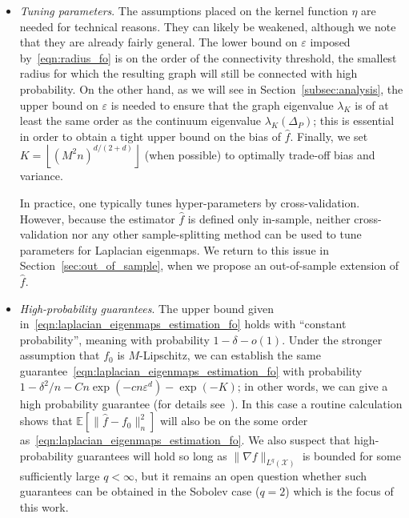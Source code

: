 \documentclass{article}
\newcommand{\floor}[1]{\left\lfloor #1 \right\rfloor}
\newcommand{\1}{\mathbf{1}}
\newcommand{\mc}[1]{\mathcal{#1}}
\newcommand{\Ebb}{\mathbb{E}}
\newcommand{\wh}[1]{\widehat{#1}}
\theoremstyle{alden}
\theoremstyle{aldenthm}
\theoremstyle{definition}
\theoremstyle{remark}
\begin{document}
\begin{itemize}
	\item \emph{Tuning parameters}. The assumptions placed on the kernel function $\eta$ are needed for technical reasons. They can likely be weakened, although we note that they are already fairly general. The lower bound on $\varepsilon$ imposed by~\eqref{eqn:radius_fo} is on the order of the connectivity threshold, the smallest radius for which the resulting graph will still be connected with high probability. On the other hand, as we will see in Section~\ref{subsec:analysis}, the upper bound on $\varepsilon$ is needed to ensure that the graph eigenvalue $\lambda_K$ is of at least the same order as the continuum eigenvalue $\lambda_K(\Delta_P)$; this is essential in order to obtain a tight upper bound on the bias of $\wh{f}$.  Finally, we set $K = \floor{(M^2n)^{d/(2 + d)}}$ (when possible) to optimally trade-off bias and variance.
	
	In practice, one typically tunes hyper-parameters by cross-validation. However, because the estimator $\wh{f}$ is defined only in-sample, neither cross-validation nor any other sample-splitting method can be used to tune parameters for Laplacian eigenmaps. We return to this issue in Section~\ref{sec:out_of_sample}, when we propose an out-of-sample extension of $\wh{f}$. 
	
	\item \emph{High-probability guarantees}. The upper bound given in~\eqref{eqn:laplacian_eigenmaps_estimation_fo} holds with ``constant probability'', meaning with probability $1 - \delta - o(1)$. Under the stronger assumption that $f_0$ is $M$-Lipschitz, we can establish the same guarantee~\eqref{eqn:laplacian_eigenmaps_estimation_fo} with probability $1 - \delta^2/n - Cn\exp(-cn\varepsilon^d) - \exp(-K)$; in other words, we can give a high probability guarantee (for details see~\citep{green2021}). In this case a routine calculation shows that $\Ebb[\|\wh{f} - f_0\|_n^2]$ will also be on the some order as~\eqref{eqn:laplacian_eigenmaps_estimation_fo}. We also suspect that high-probability guarantees will hold so long as $\|\nabla f\|_{L^q(\mc{X})}$ is bounded for some sufficiently large $q < \infty$, but it remains an open question whether such guarantees can be obtained in the Sobolev case ($q = 2$) which is the focus of this work. 
\end{itemize}
\end{document}
